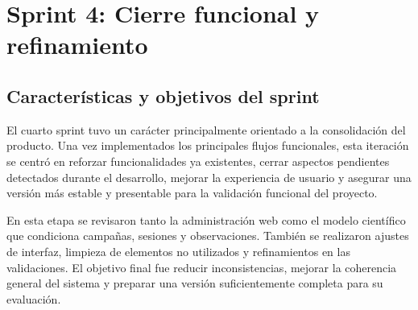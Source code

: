 
\clearpage
\section{Sprint 4: Cierre funcional y refinamiento}
\subsection{Características y objetivos del sprint}

El cuarto sprint tuvo un carácter principalmente orientado a la consolidación
del producto. Una vez implementados los principales flujos funcionales, esta
iteración se centró en reforzar funcionalidades ya existentes, cerrar aspectos
pendientes detectados durante el desarrollo, mejorar la experiencia de usuario y
asegurar una versión más estable y presentable para la validación funcional del
proyecto.

En esta etapa se revisaron tanto la administración web como el modelo científico
que condiciona campañas, sesiones y observaciones. También se realizaron
ajustes de interfaz, limpieza de elementos no utilizados y refinamientos en las
validaciones. El objetivo final fue reducir inconsistencias, mejorar la
coherencia general del sistema y preparar una versión suficientemente completa
para su evaluación.

